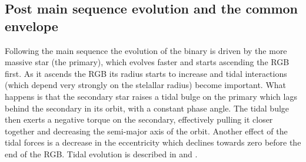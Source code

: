 \documentclass[ twoside,openright,titlepage,numbers=noenddot,headinclude,%
                footinclude=true,cleardoublepage=empty,abstractoff, %
                BCOR=5mm,paper=a4,fontsize=11pt,%
                american,%
                ]{scrreprt}
\begin{document}
\subsection{Post main sequence evolution and the common envelope}
\label{sub:Post main sequence evolution and the common envelope}
Following the main sequence the evolution of the binary is driven by
the more massive star (the primary), which evolves faster and starts
ascending the RGB first. As it ascends the RGB its radius starts to increase
and tidal interactions (which depend very strongly on the stelallar radius)
become important. What happens is that the secondary star raises a tidal bulge
on the primary which lags behind the secondary in its orbit, with a constant
phase angle. The tidal bulge then exerts a negative torque on the secondary,
effectively pulling it closer together and decreasing the semi-major axis of
the orbit. Another effect of the tidal forces is a decrease in the eccentricity
which declines towards zero before the end of the RGB. Tidal evolution
is described in \cite{murray} and \cite{zahn1989a, zahn1989b}.
\end{document}
